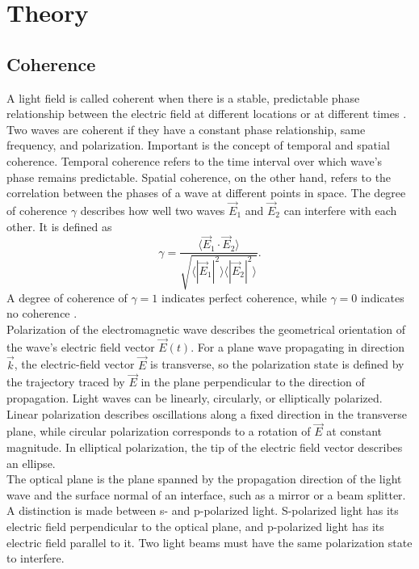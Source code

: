 \section{Theory}
\label{sec:Theorie} 

\subsection{Coherence}
A light field is called coherent when there is a stable, predictable phase relationship between the electric field at different locations or at different times \cite{RP_Coherence}.
Two waves are coherent if they have a constant phase relationship, same frequency, and polarization.
Important is the concept of temporal and spatial coherence. Temporal coherence refers to the time interval over which wave's phase remains predictable.
Spatial coherence, on the other hand, refers to the correlation between the phases of a wave at different points in space.
The degree of coherence $\gamma$ describes how well two waves $\vec{E}_1$ and $\vec{E}_2$ can interfere with each other. It is defined as
\begin{equation}
    \gamma = \frac{\langle \vec{E}_1 \cdot \vec{E}_2 \rangle}{\sqrt{\langle |\vec{E}_1|^2 \rangle \langle |\vec{E}_2|^2 \rangle}}.
\end{equation}
A degree of coherence of $\gamma = 1$ indicates perfect coherence, while $\gamma = 0$ indicates no coherence \cite{Hecht2002Optics}.\\
Polarization of the electromagnetic wave describes the geometrical orientation of the wave's electric field vector $\vec{E}(t)$. 
For a plane wave propagating in direction $\vec{k}$, the electric-field vector $\vec{E}$ is transverse, so the polarization state is defined by the trajectory traced by $\vec{E}$ in the plane perpendicular to the direction of propagation.
Light waves can be linearly, circularly, or elliptically polarized.
Linear polarization describes oscillations along a fixed direction in the transverse plane, while circular polarization corresponds to a rotation of $\vec{E}$ at constant magnitude.
In elliptical polarization, the tip of the electric field vector describes an ellipse.\\
The optical plane is the plane spanned by the propagation direction of the light wave and the surface normal of an interface, such as a mirror or a beam splitter.
A distinction is made between s- and p-polarized light. S-polarized light has its electric field perpendicular to the optical plane, and p-polarized light has its electric field parallel to it.
Two light beams must have the same polarization state to interfere.
